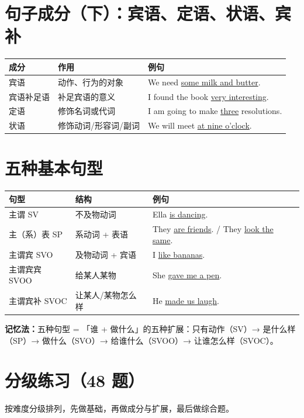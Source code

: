 \documentclass[11pt,a4paper]{ctexart}
\begin{document}
\section{句子成分（下）：宾语、定语、状语、宾补}
\begin{center}
\begin{tabular}{p{3.2cm}p{5.0cm}p{5.2cm}}
\hline
\textbf{成分} & \textbf{作用} & \textbf{例句}\\
\hline
宾语 & 动作、行为的对象 & We need \underline{some milk and butter}.\\
宾语补足语 & 补足宾语的意义 & I found the book \underline{very interesting}.\\
定语 & 修饰名词或代词 & I am going to make \underline{three} resolutions.\\
状语 & 修饰动词/形容词/副词 & We will meet \underline{at nine o'clock}.\\
\hline
\end{tabular}
\end{center}

\section{五种基本句型}
\begin{center}
\begin{tabular}{p{3.4cm}p{4.6cm}p{5.4cm}}
\hline
\textbf{句型} & \textbf{结构} & \textbf{例句}\\
\hline
主谓 SV & 不及物动词 & Ella \underline{is dancing}.\\
主（系）表 SP & 系动词 + 表语 & They \underline{are friends}. / They \underline{look the same}.\\
主谓宾 SVO & 及物动词 + 宾语 & I \underline{like bananas}.\\
主谓宾宾 SVOO & 给某人某物 & She \underline{gave me a pen}.\\
主谓宾补 SVOC & 让某人/某物怎么样 & He \underline{made us laugh}.\\
\hline
\end{tabular}
\end{center}
\textbf{记忆法：}五种句型 = 「谁 + 做什么」的五种扩展：只有动作（SV）→ 是什么样（SP）→ 做什么（SVO）→ 给谁什么（SVOO）→ 让谁怎么样（SVOC）。


\newpage
\section{分级练习（48 题）}
\noindent 按难度分级排列，先做基础，再做成分与扩展，最后做综合题。
\end{document}

